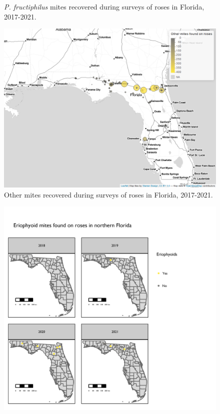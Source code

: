 \documentclass[12pt,final,CPage]{ufthesis}
\begin{document}
{\begin{figure}[p]
{  }

  \caption[\textit{P. fructiphilus} mites recovered during surveys of roses in Florida]{\textit{P. fructiphilus} mites recovered during surveys of roses in Florida, 2017-2021.}\label{fig:survey-map-1}
  \end{figure}
  \begin{figure}[p]

  {\centering \includegraphics[width=1\linewidth]{figure/rrv_survey_map_fl_other} 

  }

  \caption[Other mites recovered during surveys of roses in Florida]{Other mites recovered during surveys of roses in Florida, 2017-2021.}\label{fig:survey-map-2}
  \end{figure}
  \begin{figure}[p]

  {\centering \includegraphics[width=1\linewidth]{figure/rrv_survey_map_years_pf} 

}
\end{figure}}
\end{document}
